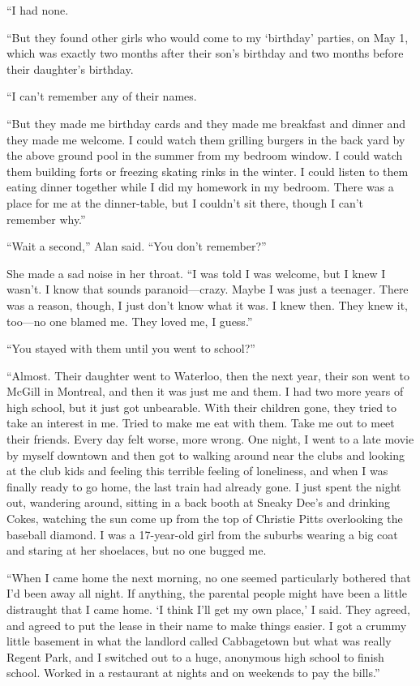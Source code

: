 ``I had none.

``But they found other girls who would come to my `birthday' parties,
on May 1, which was exactly two months after their son's birthday and
two months before their daughter's birthday.

``I can't remember any of their names.

``But they made me birthday cards and they made me breakfast and
dinner and they made me welcome.  I could watch them grilling burgers
in the back yard by the above ground pool in the summer from my
bedroom window.  I could watch them building forts or freezing skating
rinks in the winter.  I could listen to them eating dinner together
while I did my homework in my bedroom.  There was a place for me at
the dinner-table, but I couldn't sit there, though I can't remember
why.''

``Wait a second,'' Alan said.  ``You don't remember?''

She made a sad noise in her throat.  ``I was told I was welcome, but I
knew I wasn't.  I know that sounds paranoid---crazy.  Maybe I was just
a teenager.  There was a reason, though, I just don't know what it
was.  I knew then.  They knew it, too---no one blamed me.  They loved
me, I guess.''

``You stayed with them until you went to school?''

``Almost.  Their daughter went to Waterloo, then the next year, their
son went to McGill in Montreal, and then it was just me and them.  I
had two more years of high school, but it just got unbearable.  With
their children gone, they tried to take an interest in me.  Tried to
make me eat with them.  Take me out to meet their friends.  Every day
felt worse, more wrong.  One night, I went to a late movie by myself
downtown and then got to walking around near the clubs and looking at
the club kids and feeling this terrible feeling of loneliness, and
when I was finally ready to go home, the last train had already gone. 
I just spent the night out, wandering around, sitting in a back booth
at Sneaky Dee's and drinking Cokes, watching the sun come up from the
top of Christie Pitts overlooking the baseball diamond.  I was a
17-year-old girl from the suburbs wearing a big coat and staring at
her shoelaces, but no one bugged me.

``When I came home the next morning, no one seemed particularly
bothered that I'd been away all night.  If anything, the parental
people might have been a little distraught that I came home.  `I think
I'll get my own place,' I said.  They agreed, and agreed to put the
lease in their name to make things easier.  I got a crummy little
basement in what the landlord called Cabbagetown but what was really
Regent Park, and I switched out to a huge, anonymous high school to
finish school.  Worked in a restaurant at nights and on weekends to
pay the bills.''

